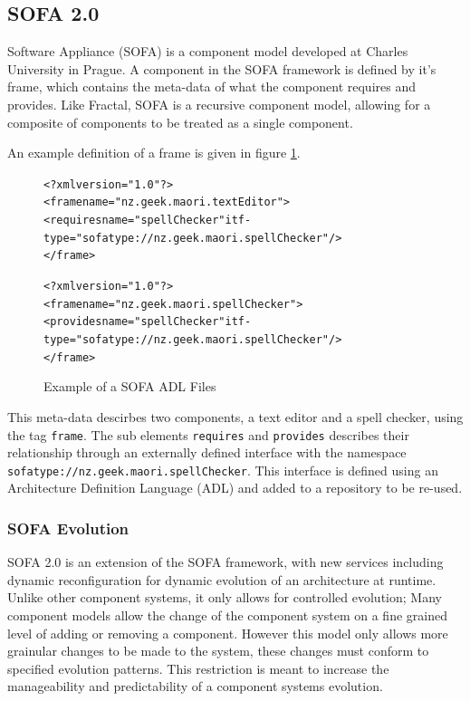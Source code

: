 \subsection{SOFA 2.0}
Software Appliance (SOFA) is a component model developed at Charles University in Prague.
A component in the SOFA framework is defined by it's frame, which contains the meta-data of what the component requires and provides.
Like Fractal, SOFA is a recursive component model, allowing for a composite of components to be treated as a single component.

An example definition of a frame is given in figure \ref{SOFAmetadata}.

\begin{figure}[htp] 
\begin{center}
\begin{alltt}
<?xml version="1.0"?>
<frame name="nz.geek.maori.textEditor">
  <requires name="spellChecker" itf-type="sofatype://nz.geek.maori.spellChecker"/>
</frame>

<?xml version="1.0"?>
<frame name="nz.geek.maori.spellChecker">
  <provides name="spellChecker" itf-type="sofatype://nz.geek.maori.spellChecker"/>
</frame>
\end{alltt}
  \caption[SOFA ADL files]{Example of a SOFA ADL Files}
  \label{SOFAmetadata}
\end{center}
\end{figure}

This meta-data descirbes two components, a text editor and a spell checker, using the tag \verb+frame+.
The sub elements \verb+requires+ and \verb+provides+ describes their relationship through an externally defined interface with the namespace \verb+sofatype://nz.geek.maori.spellChecker+.
This interface is defined using an Architecture Definition Language (ADL) and added to a repository to be re-used. 


\subsubsection{SOFA Evolution}
SOFA 2.0 is an extension of the SOFA framework, with new services including dynamic reconfiguration for dynamic evolution of an architecture at runtime. 
Unlike other component systems,
it only allows for controlled evolution; 
Many component models allow the change of the component system on a fine grained level of adding or removing a component.
However this model only allows more grainular changes to be made to the system, these changes must conform to specified evolution patterns.
This restriction is meant to increase the manageability and predictability of a component systems evolution. 

